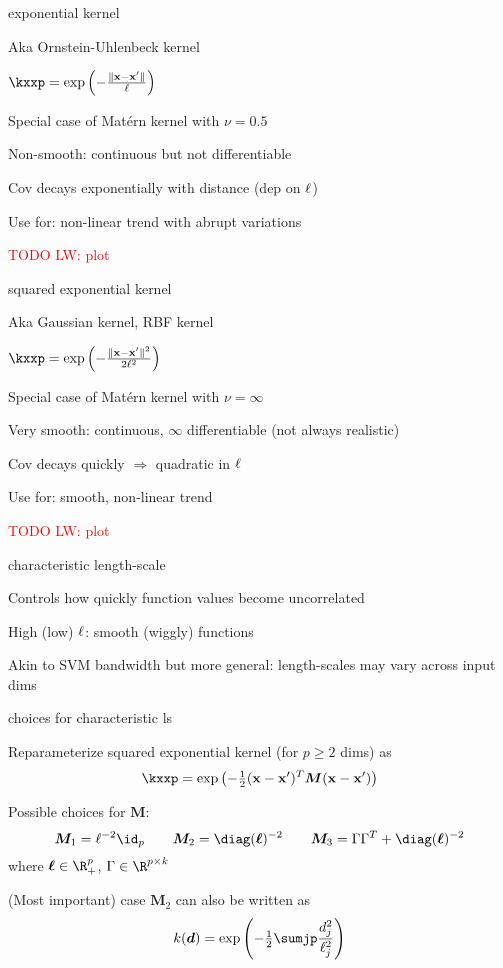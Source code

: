 \documentclass[11pt,compress,t,notes=noshow, xcolor=table]{beamer}
\begin{document}
\begin{framei}{exponential kernel}
\item Aka Ornstein-Uhlenbeck kernel
\item $\kxxp = \exp \left(-\frac{\| \xv - \xv^\prime \|}{\ls} \right)$
\item Special case of Matérn kernel with $\nu = 0.5$
\item Non-smooth: continuous but not differentiable
\item Cov decays exponentially with distance (dep on $\ell$)
\item Use for: non-linear trend with abrupt variations
\item \textcolor{red}{TODO LW: plot}
\end{framei}

\begin{framei}{squared exponential kernel}
\item Aka Gaussian kernel, RBF kernel
\item $\kxxp = \exp \left(-\frac{\| \xv - \xv^\prime \|^2}{2\ls^2} \right)$
\item Special case of Matérn kernel with $\nu = \infty$
\item Very smooth: continuous, $\infty$ differentiable (not always realistic)
\item Cov decays quickly $\Rightarrow$ quadratic in $\ell$
\item Use for: smooth, non-linear trend
\item \textcolor{red}{TODO LW: plot}
\end{framei}

\begin{framei}[sep=L]{characteristic length-scale}
\item Controls how quickly function values become uncorrelated
\item High (low) $\ell$: smooth (wiggly) functions
\vfill
{}
\item Akin to SVM bandwidth but more general: length-scales may vary across input dims
\end{framei}

\begin{framei}[sep=L]{choices for characteristic ls}
\item Reparameterize squared exponential kernel (for $p \geq 2$ dims) as
$$
\kxxp = \exp \left(- \tfrac{1}{2}(\xv - \xv^\prime)^T\bm{M} (\xv - \xv^\prime )\right)
$$
\item Possible choices for $\bm{M}$:
$$
\bm{M}_1 = \ls^{-2}\id_p \qquad \bm{M}_2 = \diag(\bm{\ls})^{-2} \qquad \bm{M}_3 = \Gamma \Gamma^T + \diag(\bm{\ls})^{-2}
$$
where $\bm{\ls} \in \R^p_+$, $\Gamma \in \R^{p \times k}$ 
\item (Most important) case $\bm{M}_2$ can also be written as
$$
  k(\bm{d}) = \exp \left(- \tfrac{1}{2} \sumjp \frac{d_j^2}{\ell_j^2} \right)
$$
\end{framei}
\end{document}
